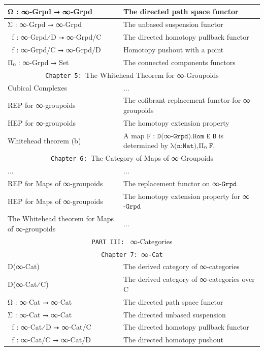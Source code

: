 \documentclass{book}
\theoremstyle{definition}
\begin{document}
{\begin{longtable}{|| l || l ||}
\hline
Ω⃡ : ∞-Grpd ⭢ ∞-Grpd & The directed path space functor \\
 \hline 
Σ⃡ : ∞-Grpd ⭢ ∞-Grpd & The unbased suspension functor \\
 \hline 
ω⃡ f : ∞-Grpd⁄D ⭢ ∞-Grpd/C & The directed homotopy pullback functor\\
\hline 
σ⃡ f : ∞-Grpd/C ⭢ ∞-Grpd/D & Homotopy pushout with a point \\
 \hline 
Πₙ : ∞-Grpd ⭢ Set & The connected components functors\\
 \hline \hline
 \multicolumn{2}{||c||}{\texttt{Chapter 5: }The Whitehead Theorem for ∞-Groupoids} \\
\hline \hline
Cubical Complexes & ...\\
\hline
REP for ∞-groupoids & The cofibrant replacement functor for ∞-groupoids\\
\hline
HEP for ∞-groupoids & The homotopy extension property\\
\hline
Whitehead theorem (b) & A map $\texttt{F : D(}$∞$\texttt{-Grpd).Hom E B}$ is determined by $\texttt{λ(n:Nat),}$Πₙ
$\texttt{F}$. \\
\hline \hline
\multicolumn{2}{||c||}{\texttt{Chapter 6: }The Category of Maps of ∞-Groupoids} \\
\hline \hline
... & ...\\
\hline
REP for Maps of ∞-groupoids & The replacement functor on ∞$\texttt{-Grpd}$ \\
\hline
HEP for Maps of ∞-groupoids & The homotopy extension property for ∞$\texttt{-Grpd}$\\
 \hline 
The Whitehead theorem for Maps of ∞-groupoids & ... \\
\hline \hline
 \multicolumn{2}{||c||}{\texttt{PART III: } ∞-Categories} \\
\hline \hline
\multicolumn{2}{||c||}{\texttt{Chapter 7: }∞\texttt{-Cat}} \\
\hline \hline
D(∞-Cat) & The derived category of ∞-categories \\
\hline
D(∞-Cat⁄C) & The derived category of ∞-categories over C \\
\hline
Ω⃗ : ∞-Cat ⭢ ∞-Cat & The directed path space functor \\
 \hline 
 Σ⃗ : ∞-Cat ⭢ ∞-Cat & The directed unbased suspension \\
\hline 
ω⃗ f : ∞-Cat⁄D ⭢ ∞-Cat/C & The directed homotopy pullback functor\\
 \hline 
 σ⃗ f : ∞-Cat/C ⭢ ∞-Cat/D & The directed homotopy pushout \\

\end{longtable}}
\end{document}
